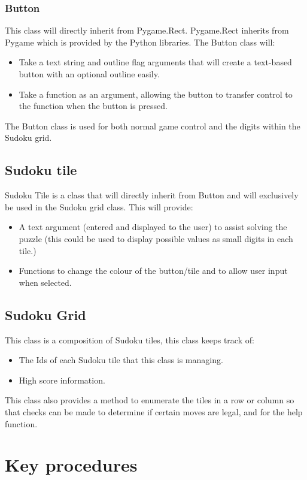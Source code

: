 \documentclass[fleqn]{article}
\begin{document}
\subsubsection{Button}
This class will directly inherit from Pygame.Rect. Pygame.Rect inherits from Pygame which is provided by the Python libraries. The Button class will:
\begin{itemize}
\item Take a text string and outline flag arguments that will create a text-based button with an optional outline easily.
\item Take a function as an argument, allowing the button to transfer control to the function when the button is pressed.
\end{itemize}
The Button class is used for both normal game control and the digits within the Sudoku grid.
\subsection{Sudoku tile}
Sudoku Tile is a class that will directly inherit from Button and will exclusively be used in the Sudoku grid class. This will provide:
\begin{itemize}
\item A text argument (entered and displayed to the user) to assist solving the puzzle (this could be used to display possible values as small digits in each tile.)
\item Functions to change the colour of the button/tile and to allow user input when selected.
\end{itemize}
\subsection{Sudoku Grid}
This class is a composition of Sudoku tiles, this class keeps track of:
\begin{itemize}
\item The Ids of each Sudoku tile that this class is managing.
\item High score information.
\end{itemize}
This class also provides a method to enumerate the tiles in a row or column so that checks can be made to determine if certain moves are legal, and for the help function.

\section{Key procedures}
 
\end{document}
